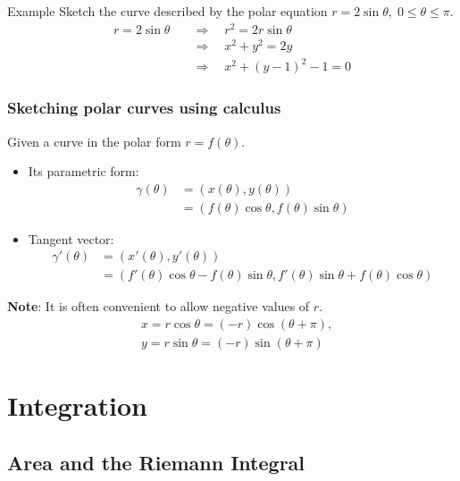 \documentclass{report}
\begin{document}
			\begin{question}{Example}
				Sketch the curve described by the polar equation $r = 2\sin \theta, \; 0 \leq \theta \leq \pi$.
					\begin{align*}
						r = 2 \sin \theta \quad &\Rightarrow \quad r^2 = 2 r \sin \theta	\\
											  	&\Rightarrow \quad x^2 + y^2 = 2y			\\
											  	&\Rightarrow \quad x^2 + (y-1)^2 - 1 = 0
					\end{align*}
			\end{question}

		\subsection{Sketching polar curves using calculus}

			Given a curve in the polar form $r = f(\theta)$.
			\begin{itemize}
				\item Its parametric form:
					\begin{align*}
						\gamma(\theta) &= (x(\theta), y(\theta))	\\
									   &= (f(\theta)\cos\theta, f(\theta)\sin\theta)
					\end{align*}
				\item Tangent vector:
					\begin{align*}
						\gamma'(\theta) &= (x'(\theta), y'(\theta))	\\
										&= \left(f'(\theta)\cos\theta - f(\theta)\sin\theta, f'(\theta)\sin\theta+f(\theta)\cos\theta\right)
					\end{align*}
			\end{itemize}

			\textbf{Note}: It is often convenient to allow negative values of $r$.
			\begin{align*}
				& x = r\cos\theta = (-r)\cos(\theta+\pi),		\\
				& y = r\sin\theta = (-r)\sin(\theta+\pi)
			\end{align*}

\chapter{Integration}

	\section{Area and the Riemann Integral}
\end{document}
